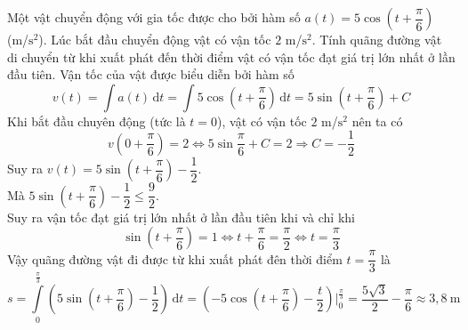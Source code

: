 \begin{bt}%
	Một vật chuyển động với gia tốc được cho bởi hàm số $a(t)=5\cos\left(t+\dfrac{\pi}{6}\right)$ (m/$\mathrm{s}^2$). Lúc bắt đầu chuyển động vật có vận tốc $2$ m/$\mathrm{s}^2$. Tính quãng đường vật di chuyển từ khi xuất phát đến thời điểm vật có vận tốc đạt giá trị lớn nhất ở lần đầu tiên.
	\loigiai
	{Vận tốc của vật được biểu diễn bởi hàm số $$v(t)=\displaystyle\int a(t)\mathrm{\,d}t=\displaystyle\int 5\cos\left(t+\dfrac{\pi}{6}\right)\mathrm{\,d}t=5\sin\left(t+\dfrac{\pi}{6}\right)+C$$
		Khi bắt đầu chuyên động (tức là $t=0$), vật có vận tốc $2$ m/$\mathrm{s}^2$ nên ta có$$v\left(0+\dfrac{\pi}{6}\right)=2\Leftrightarrow 5\sin\dfrac{\pi}{6}+C=2\Rightarrow C=-\dfrac{1}{2}$$
		Suy ra $v(t)=5\sin\left(t+\dfrac{\pi}{6}\right)-\dfrac{1}{2}$.\\
		Mà $5\sin\left(t+\dfrac{\pi}{6}\right)-\dfrac{1}{2}\leq \dfrac{9}{2}$.\\
		Suy ra vận tốc đạt giá trị lớn nhất ở lần đầu tiên khi và chỉ khi $$\sin\left(t+\dfrac{\pi}{6}\right)=1\Leftrightarrow t+\dfrac{\pi}{6}=\dfrac{\pi}{2}\Leftrightarrow t=\dfrac{\pi}{3}$$
		Vậy quãng đường vật đi được từ khi xuất phát đên thời điểm $t=\dfrac{\pi}{3}$ là 
		$$s=\displaystyle\int\limits_{0}^{\frac{\pi}{3}}\left(5\sin\left(t+\dfrac{\pi}{6}\right)-\dfrac{1}{2}\right)\mathrm{\,d}t=\left(-5\cos\left(t+\dfrac{\pi}{6}\right)-\dfrac{t}{2}\right)\Big|_0^{\frac{\pi}{3}}=\dfrac{5\sqrt{3}}{2}-\dfrac{\pi}{6}\approx 3{,}8~\mathrm{m}$$ 
	}
\end{bt}


